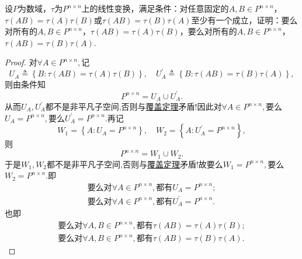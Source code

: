 \documentclass[../../main.tex]{subfiles}%
\begin{document}
\begin{example}
设\( P \)为数域，\( \tau \)为\( P^{n \times n} \)上的线性变换，满足条件：对任意固定的\( A, B \in P^{n \times n} \)，\( \tau(AB) = \tau(A)\tau(B) \)或\( \tau(AB) = \tau(B)\tau(A) \)至少有一个成立，证明：要么对所有的\( A, B \in P^{n \times n} \)，\( \tau(AB) = \tau(A)\tau(B) \)，要么对所有的\( A, B \in P^{n \times n} \)，\( \tau(AB) = \tau(B)\tau(A) \).
\end{example}
\begin{proof}

对$\forall A\in P^{n\times n},$记
$$U_A\triangleq \left\{ B:\tau \left( AB \right) =\tau \left( A \right) \tau \left( B \right) \right\}, \quad U_{A}^{\prime}\triangleq \left\{ B:\tau \left( AB \right) =\tau \left( B \right) \tau \left( A \right) \right\},$$
则由条件知
$$P^{n\times n}=U_A\cup U_{A}^{\prime}.$$
从而$U_A,U_{A}^{\prime}$都不是非平凡子空间,否则与\hyperref[theorem:覆盖定理]{覆盖定理}矛盾!因此对$\forall A\in P^{n\times n},$要么$U_A=P^{n\times n},$要么$U_{A}^{\prime}=P^{n\times n}.$再记
$$W_1=\left\{ A:U_A=P^{n\times n} \right\}, \quad W_2=\left\{ A:U_{A}^{\prime}=P^{n\times n} \right\},$$
则
$$P^{n\times n}=W_1\cup W_2.$$
于是$W_1,W_2$都不是非平凡子空间,否则与\hyperref[theorem:覆盖定理]{覆盖定理}矛盾!故要么$W_1=P^{n\times n},$要么$W_2=P^{n\times n}.$即
\begin{align*}
\text{要么对}\forall A\in P^{n\times n},\text{都有}U_A=P^{n\times n};
\\
\text{要么对}\forall A\in P^{n\times n},\text{都有}U_{A}^{\prime}=P^{n\times n}.
\end{align*}
也即
\begin{align*}
\text{要么对}\forall A,B\in P^{n\times n},\text{都有}\tau \left( AB \right) =\tau \left( A \right) \tau \left( B \right) ;
\\
\text{要么对}\forall A,B\in P^{n\times n},\text{都有}\tau \left( AB \right) =\tau \left( B \right) \tau \left( A \right) .
\end{align*}
\end{proof}
\end{document}
